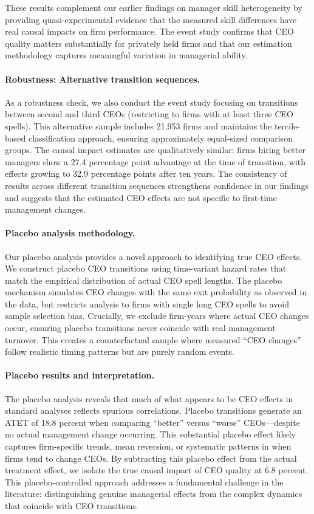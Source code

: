 \documentclass[11pt,a4paper]{article}
\begin{document}
These results complement our earlier findings on manager skill heterogeneity by providing quasi-experimental evidence that the measured skill differences have real causal impacts on firm performance. The event study confirms that CEO quality matters substantially for privately held firms and that our estimation methodology captures meaningful variation in managerial ability.

\paragraph{Robustness: Alternative transition sequences.} As a robustness check, we also conduct the event study focusing on transitions between second and third CEOs (restricting to firms with at least three CEO spells). This alternative sample includes 21,953 firms and maintains the tercile-based classification approach, ensuring approximately equal-sized comparison groups. The causal impact estimates are qualitatively similar: firms hiring better managers show a 27.4 percentage point advantage at the time of transition, with effects growing to 32.9 percentage points after ten years. The consistency of results across different transition sequences strengthens confidence in our findings and suggests that the estimated CEO effects are not specific to first-time management changes.

\paragraph{Placebo analysis methodology.} Our placebo analysis provides a novel approach to identifying true CEO effects. We construct placebo CEO transitions using time-variant hazard rates that match the empirical distribution of actual CEO spell lengths. The placebo mechanism simulates CEO changes with the same exit probability as observed in the data, but restricts analysis to firms with single long CEO spells to avoid sample selection bias. Crucially, we exclude firm-years where actual CEO changes occur, ensuring placebo transitions never coincide with real management turnover. This creates a counterfactual sample where measured ``CEO changes'' follow realistic timing patterns but are purely random events.

\paragraph{Placebo results and interpretation.} The placebo analysis reveals that much of what appears to be CEO effects in standard analyses reflects spurious correlations. Placebo transitions generate an ATET of 18.8 percent when comparing ``better'' versus ``worse'' CEOs---despite no actual management change occurring. This substantial placebo effect likely captures firm-specific trends, mean reversion, or systematic patterns in when firms tend to change CEOs. By subtracting this placebo effect from the actual treatment effect, we isolate the true causal impact of CEO quality at 6.8 percent. This placebo-controlled approach addresses a fundamental challenge in the literature: distinguishing genuine managerial effects from the complex dynamics that coincide with CEO transitions. 
\end{document}
